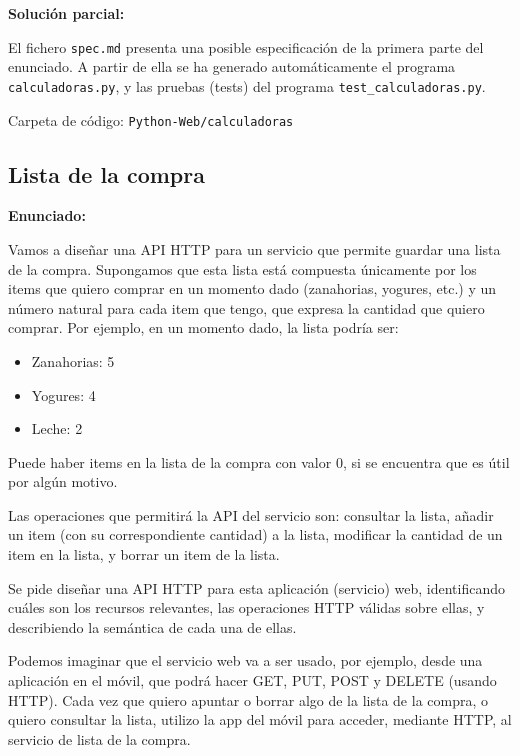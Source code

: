 \textbf{Solución parcial:}

El fichero \texttt{spec.md} presenta una posible especificación de la primera parte del enunciado. A partir de ella se ha generado automáticamente el programa \texttt{calculadoras.py}, y las pruebas (tests) del programa \texttt{test\_calculadoras.py}.

Carpeta de código: \texttt{Python-Web/calculadoras}

\subsection{Lista de la compra}
\label{subsec:lista-compra}

\textbf{Enunciado:}

Vamos a diseñar una API HTTP para un servicio que permite guardar una lista de la compra. Supongamos que esta lista está compuesta únicamente por los items que quiero comprar en un momento dado (zanahorias, yogures, etc.) y un número natural para cada item que tengo, que expresa la cantidad que quiero comprar. Por ejemplo, en un momento dado, la lista podría ser:

\begin{itemize}
\item Zanahorias: 5
\item Yogures: 4
\item Leche: 2
\end{itemize}

Puede haber items en la lista de la compra con valor 0, si se encuentra que es útil por algún motivo.

Las operaciones que permitirá la API del servicio son: consultar la lista, añadir un item (con su correspondiente cantidad) a la lista, modificar la cantidad de un item en la lista, y borrar un item de la lista.

Se pide diseñar una API HTTP para esta aplicación (servicio) web, identificando cuáles son los recursos relevantes, las operaciones HTTP válidas sobre ellas, y describiendo la semántica de cada una de ellas.

Podemos imaginar que el servicio web va a ser usado, por ejemplo, desde una aplicación en el móvil, que podrá hacer GET, PUT, POST y DELETE (usando HTTP). Cada vez que quiero apuntar o borrar algo de la lista de la compra, o quiero consultar la lista, utilizo la app del móvil para acceder, mediante HTTP, al servicio de lista de la compra.

